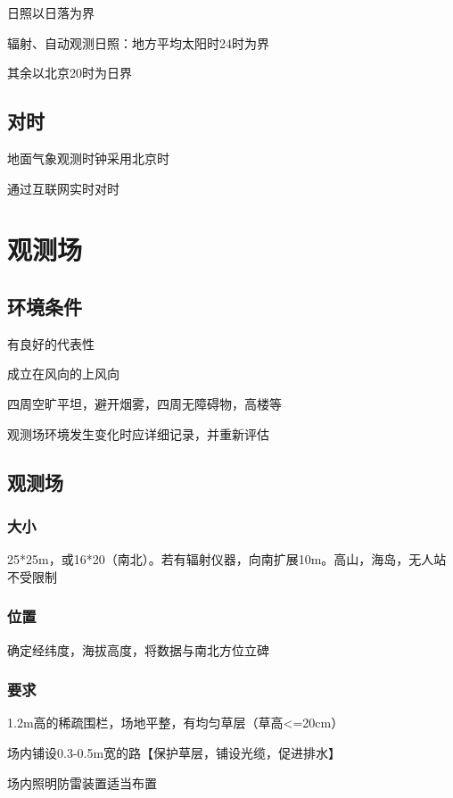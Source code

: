 ﻿\documentclass[UTF8,11pt]{ctexbook}%
\begin{document}
日照以日落为界

辐射、自动观测日照：地方平均太阳时24时为界

其余以北京20时为日界

\subsection{对时}

地面气象观测时钟采用北京时

通过互联网实时对时

\section{观测场}

\subsection{环境条件}

有良好的代表性

成立在风向的上风向

四周空旷平坦，避开烟雾，四周无障碍物，高楼等

观测场环境发生变化时应详细记录，并重新评估

\subsection{观测场}

\subsubsection{大小}

25*25m，或16*20（南北）。若有辐射仪器，向南扩展10m。高山，海岛，无人站不受限制

\subsubsection{位置}

确定经纬度，海拔高度，将数据与南北方位立碑

\subsubsection{要求}

1.2m高的稀疏围栏，场地平整，有均匀草层（草高<=20cm）

场内铺设0.3-0.5m宽的路【保护草层，铺设光缆，促进排水】

场内照明防雷装置适当布置
\end{document}
